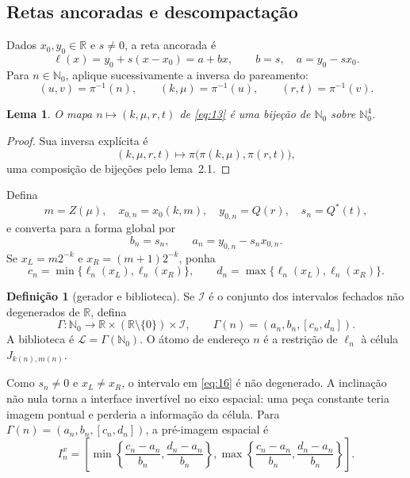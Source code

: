 \documentclass[11pt,a4paper]{article}
\theoremstyle{preciso}
\newtheorem{lema}[teorema]{Lema}
\theoremstyle{definition}
\newtheorem{definicao}[teorema]{Definição}
\newcommand{\N}{\mathbb N}
\newcommand{\R}{\mathbb R}
\newcommand{\LL}{\mathcal L}
\newcommand{\eqn}[2]{\begin{equation}\label{eq:#1}#2\end{equation}}
\begin{document}
\subsection{Retas ancoradas e descompactação}
Dados $x_0,y_0\in\R$ e $s\ne0$, a reta ancorada é
\eqn{12}{\ell(x)=y_0+s(x-x_0)=a+bx,\qquad b=s,\quad a=y_0-sx_0.}
Para $n\in\N_0$, aplique sucessivamente a inversa do pareamento:
\eqn{13}{(u,v)=\pi^{-1}(n),\qquad(k,\mu)=\pi^{-1}(u),\qquad(r,t)=\pi^{-1}(v).}
\begin{lema}
O mapa $n\mapsto(k,\mu,r,t)$ de \eqref{eq:13} é uma bijeção de $\N_0$ sobre $\N_0^4$.
\end{lema}
\begin{proof}
Sua inversa explícita é
\[
(k,\mu,r,t)\longmapsto\pi\bigl(\pi(k,\mu),\pi(r,t)\bigr),
\]
uma composição de bijeções pelo lema~2.1.
\end{proof}
Defina
\eqn{14}{m=Z(\mu),\quad x_{0,n}=x_0(k,m),\quad y_{0,n}=Q(r),\quad s_n=Q^*(t),}
e converta para a forma global por
\eqn{15}{b_n=s_n,\qquad a_n=y_{0,n}-s_nx_{0,n}.}
Se $x_L=m2^{-k}$ e $x_R=(m+1)2^{-k}$, ponha
\eqn{16}{c_n=\min\{\ell_n(x_L),\ell_n(x_R)\},\qquad d_n=\max\{\ell_n(x_L),\ell_n(x_R)\}.}
\begin{definicao}[gerador e biblioteca]
Se $\mathcal I$ é o conjunto dos intervalos fechados não degenerados de $\R$, defina
\eqn{17}{\Gamma:\N_0\to\R\times(\R\setminus\{0\})\times\mathcal I,\qquad
\Gamma(n)=(a_n,b_n,[c_n,d_n]).}
A biblioteca é $\LL=\Gamma(\N_0)$. O átomo de endereço $n$ é a restrição de $\ell_n$ à célula $J_{k(n),m(n)}$.
\end{definicao}
Como $s_n\ne0$ e $x_L\ne x_R$, o intervalo em \eqref{eq:16} é não degenerado. A inclinação não nula torna a interface invertível no eixo espacial: uma peça constante teria imagem pontual e perderia a informação da célula. Para $\Gamma(n)=(a_n,b_n,[c_n,d_n])$, a pré-imagem espacial é
\eqn{18}{I_n^x=\left[
\min\left\{\frac{c_n-a_n}{b_n},\frac{d_n-a_n}{b_n}\right\},
\max\left\{\frac{c_n-a_n}{b_n},\frac{d_n-a_n}{b_n}\right\}\right].}
\end{document}
